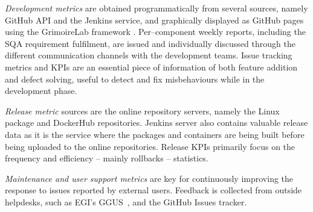 \textit{Development metrics} are obtained programmatically from several sources, namely GitHub
API \cite{foot4} and the Jenkins \cite{foot5} service, and graphically displayed as GitHub
pages using the GrimoireLab framework \cite{foot6}.
Per--component weekly reports, including the SQA requirement
fulfilment, are issued and individually discussed through the different communication channels
with the development teams. Issue tracking metrics and KPIs are an essential piece of information
of both feature addition and defect solving, useful to detect and fix misbehaviours while in the
development phase.

\textit{Release metric} sources are the online repository servers, namely the
Linux package \cite{foot7} and DockerHub \cite{foot8} repositories. Jenkins
server also contains valuable release data as it is the service where the packages
and containers are being built before being uploaded to the online repositories. Release
KPIs primarily focus on the frequency and efficiency -- mainly rollbacks -- statistics.

\textit{Maintenance and user support metrics} are key for continuously improving the response
to issues reported by external users. Feedback is collected from outside helpdesks, such as
EGI's GGUS~\cite{ggus}, and the GitHub Issues tracker.

